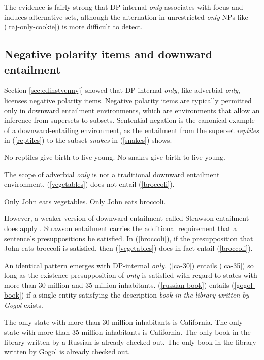 The evidence is fairly strong that DP-internal \textit{only} associates with focus and induces alternative sets, although the alternation in unrestricted \textit{only} NPs like (\ref{raj-only-cookie}) is more difficult to detect.

\subsection{Negative polarity items and downward entailment}
Section \ref{sec:edinstvennyj} showed that DP-internal \textit{only}, like adverbial \textit{only}, licenses negative polarity items. Negative polarity items are typically permitted only in downward entailment environments, which are environments that allow an inference from supersets to subsets. Sentential negation is the canonical example of a downward-entailing environment, as the entailment from the superset \textit{reptiles} in (\ref{reptiles}) to the subset \textit{snakes} in (\ref{snakes}) shows.

\begin{exe}
	\ex \label{reptiles} No reptiles give birth to live young.
	\ex \label{snakes} No snakes give birth to live young.
\end{exe}

The scope of adverbial \textit{only} is not a traditional downward entailment environment. (\ref{vegetables}) does not entail (\ref{broccoli}).

\begin{exe}
	\ex \label{vegetables} Only John eats vegetables.
	\ex \label{broccoli} Only John eats broccoli.
\end{exe}

However, a weaker version of downward entailment called Strawson entailment does apply \citep{fintel99}. Strawson entailment carries the additional requirement that a sentence's presuppositions be satisfied. In (\ref{broccoli}), if the presupposition that John eats broccoli is satisfied, then (\ref{vegetables}) does in fact entail (\ref{broccoli}).

An identical pattern emerges with DP-internal \textit{only}. (\ref{ca-30}) entails (\ref{ca-35}) so long as the existence presupposition of \textit{only} is satisfied with regard to states with more than 30 million and 35 million inhabitants. (\ref{russian-book}) entails (\ref{gogol-book}) if a single entity satisfying the description \textit{book in the library written by Gogol} exists.

\begin{exe}
	\ex \label{ca-30} The only state with more than 30 million inhabitants is California.
	\ex \label{ca-35} The only state with more than 35 million inhabitants is California.
	\ex \label{russian-book} The only book in the library written by a Russian is already checked out.
	\ex \label{gogol-book} The only book in the library written by Gogol is already checked out.
\end{exe}


